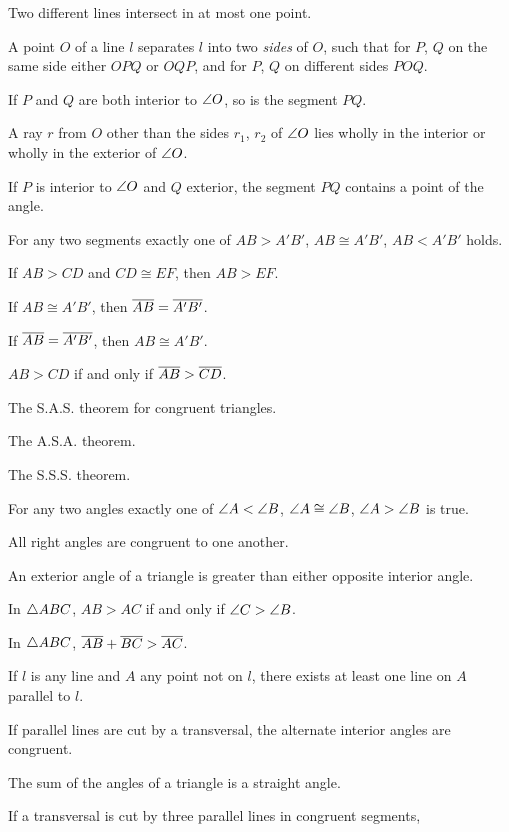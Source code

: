 \documentclass[11pt]{book}
\begin{document}
\begin{applist}
\item Two different lines intersect in at most one point.
\item A point $O$ of a line $l$ separates $l$ into two \emph{sides} of $O$,
      such that for $P$, $Q$ on the same side either $OPQ$ or $OQP$, and for
      $P$, $Q$ on different sides $POQ$.
\item If $P$ and $Q$ are both interior to $\angle O$, so is the segment $PQ$.
\item A ray $r$ from $O$ other than the sides $r_1$, $r_2$ of $\angle O$ lies
      wholly in the interior or wholly in the exterior of $\angle O$.
\item If $P$ is interior to $\angle O$ and $Q$ exterior, the segment $PQ$
      contains a point of the angle.
\item For any two segments exactly one of $AB > A'B'$, $AB \cong A'B'$,
      $AB < A'B'$ holds.
\item If $AB > CD$ and $CD \cong EF$, then $AB > EF$.
\item If $AB \cong A'B'$, then $\overline{AB} = \overline{A'B'}$.
\item If $\overline{AB} = \overline{A'B'}$, then $AB \cong A'B'$.
\item $AB > CD$ if and only if $\overline{AB} > \overline{CD}$.
\item The S.A.S. theorem for congruent triangles.
\item The A.S.A. theorem.
\item The S.S.S. theorem.
\item For any two angles exactly one of $\angle A < \angle B$,
      $\angle A \cong \angle B$, $\angle A > \angle B$ is true.
\item All right angles are congruent to one another.
\item An exterior angle of a triangle is greater than either opposite
      interior angle.
\item In $\triangle ABC$, $AB > AC$ if and only if $\angle C > \angle B$.
\item In $\triangle ABC$, $\overline{AB} + \overline{BC} > \overline{AC}$.
\item If $l$ is any line and $A$ any point not on $l$, there exists at least
      one line on $A$ parallel to $l$.
\item If parallel lines are cut by a transversal, the alternate interior
      angles are congruent.
\item The sum of the angles of a triangle is a straight angle.
\item If a transversal is cut by three parallel lines in congruent segments,

\end{applist}
\end{document}
